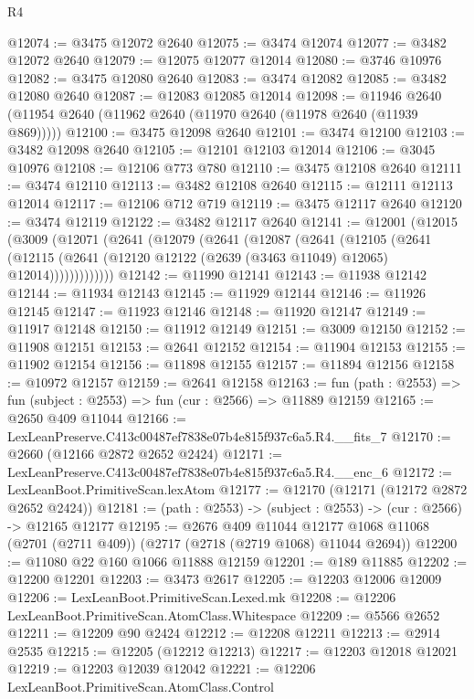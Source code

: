 \begin{lexlean}{R4}
\begin{coremodule}
@12074 := @3475 @12072 @2640
@12075 := @3474 @12074
@12077 := @3482 @12072 @2640
@12079 := @12075 @12077 @12014
@12080 := @3746 @10976
@12082 := @3475 @12080 @2640
@12083 := @3474 @12082
@12085 := @3482 @12080 @2640
@12087 := @12083 @12085 @12014
@12098 := @11946 @2640 (@11954 @2640 (@11962 @2640 (@11970 @2640 (@11978 @2640 (@11939 @869)))))
@12100 := @3475 @12098 @2640
@12101 := @3474 @12100
@12103 := @3482 @12098 @2640
@12105 := @12101 @12103 @12014
@12106 := @3045 @10976
@12108 := @12106 @773 @780
@12110 := @3475 @12108 @2640
@12111 := @3474 @12110
@12113 := @3482 @12108 @2640
@12115 := @12111 @12113 @12014
@12117 := @12106 @712 @719
@12119 := @3475 @12117 @2640
@12120 := @3474 @12119
@12122 := @3482 @12117 @2640
@12141 := @12001
    (@12015
      (@3009
        (@12071
          (@2641
            (@12079
              (@2641
                (@12087
                  (@2641
                    (@12105
                      (@2641
                        (@12115
                          (@2641 (@12120 @12122 (@2639 (@3463 @11049) @12065) @12014)))))))))))))
@12142 := @11990 @12141
@12143 := @11938 @12142
@12144 := @11934 @12143
@12145 := @11929 @12144
@12146 := @11926 @12145
@12147 := @11923 @12146
@12148 := @11920 @12147
@12149 := @11917 @12148
@12150 := @11912 @12149
@12151 := @3009 @12150
@12152 := @11908 @12151
@12153 := @2641 @12152
@12154 := @11904 @12153
@12155 := @11902 @12154
@12156 := @11898 @12155
@12157 := @11894 @12156
@12158 := @10972 @12157
@12159 := @2641 @12158
@12163 := fun (path : @2553) => fun (subject : @2553) => fun (cur : @2566) => @11889 @12159
@12165 := @2650 @409 @11044
@12166 := LexLeanPreserve.C413c00487ef7838e07b4e815f937c6a5.R4.__fits_7
@12170 := @2660 (@12166 @2872 @2652 @2424)
@12171 := LexLeanPreserve.C413c00487ef7838e07b4e815f937c6a5.R4.__enc_6
@12172 := LexLeanBoot.PrimitiveScan.lexAtom
@12177 := @12170 (@12171 (@12172 @2872 @2652 @2424))
@12181 := (path : @2553) -> (subject : @2553) -> (cur : @2566) -> @12165 @12177
@12195 := @2676
    @409
    @11044
    @12177
    @1068
    @11068
    (@2701 (@2711 @409))
    (@2717 (@2718 (@2719 @1068) @11044 @2694))
@12200 := @11080 @22 @160 @1066 @11888 @12159
@12201 := @189 @11885
@12202 := @12200 @12201
@12203 := @3473 @2617
@12205 := @12203 @12006 @12009
@12206 := LexLeanBoot.PrimitiveScan.Lexed.mk
@12208 := @12206 LexLeanBoot.PrimitiveScan.AtomClass.Whitespace
@12209 := @5566 @2652
@12211 := @12209 @90 @2424
@12212 := @12208 @12211
@12213 := @2914 @2535
@12215 := @12205 (@12212 @12213)
@12217 := @12203 @12018 @12021
@12219 := @12203 @12039 @12042
@12221 := @12206 LexLeanBoot.PrimitiveScan.AtomClass.Control

\end{coremodule}
\end{lexlean}
